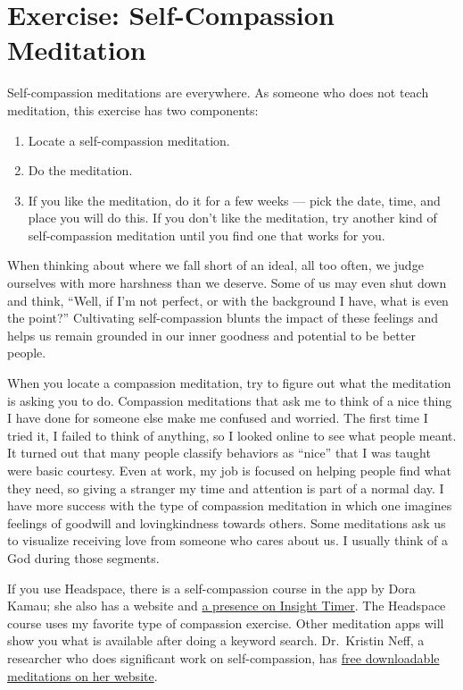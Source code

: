 \documentclass[
]{book}
\providecommand{\tightlist}{%
  \setlength{\itemsep}{0pt}\setlength{\parskip}{0pt}}
\begin{document}
\hypertarget{exercise-self-compassion-meditation}{%
\section{Exercise: Self-Compassion Meditation}\label{exercise-self-compassion-meditation}}

Self-compassion meditations are everywhere. As someone who does not teach meditation, this exercise has two components:

\begin{enumerate}
\def\labelenumi{\arabic{enumi}.}
\tightlist
\item
  Locate a self-compassion meditation.
\item
  Do the meditation.
\item
  If you like the meditation, do it for a few weeks --- pick the date, time, and place you will do this. If you don't like the meditation, try another kind of self-compassion meditation until you find one that works for you.
\end{enumerate}

When thinking about where we fall short of an ideal, all too often, we judge ourselves with more harshness than we deserve. Some of us may even shut down and think, ``Well, if I'm not perfect, or with the background I have, what is even the point?'' Cultivating self-compassion blunts the impact of these feelings and helps us remain grounded in our inner goodness and potential to be better people.

When you locate a compassion meditation, try to figure out what the meditation is asking you to do. Compassion meditations that ask me to think of a nice thing I have done for someone else make me confused and worried. The first time I tried it, I failed to think of anything, so I looked online to see what people meant. It turned out that many people classify behaviors as ``nice'' that I was taught were basic courtesy. Even at work, my job is focused on helping people find what they need, so giving a stranger my time and attention is part of a normal day. I have more success with the type of compassion meditation in which one imagines feelings of goodwill and lovingkindness towards others. Some meditations ask us to visualize receiving love from someone who cares about us. I usually think of a God during those segments.

If you use Headspace, there is a self-compassion course in the app by Dora Kamau; she also has a website and \href{https://insighttimer.com/dorakamau}{a presence on Insight Timer}. The Headspace course uses my favorite type of compassion exercise. Other meditation apps will show you what is available after doing a keyword search. Dr.~Kristin Neff, a researcher who does significant work on self-compassion, has \href{https://self-compassion.org/guided-self-compassion-meditations-mp3-2/}{free downloadable meditations on her website}.
\end{document}
